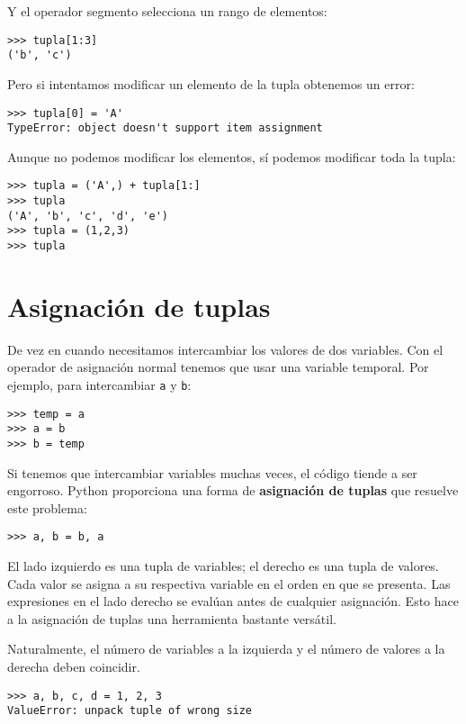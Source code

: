 Y el operador segmento selecciona un rango de elementos:
\begin{lstlisting}
>>> tupla[1:3]
('b', 'c')
\end{lstlisting}

Pero si intentamos modificar un elemento de la tupla obtenemos un
error:

\begin{lstlisting}
>>> tupla[0] = 'A'
TypeError: object doesn't support item assignment
\end{lstlisting}

Aunque no podemos modificar los elementos, sí podemos modificar toda
la tupla:
\begin{lstlisting}
>>> tupla = ('A',) + tupla[1:]
>>> tupla
('A', 'b', 'c', 'd', 'e')
>>> tupla = (1,2,3)
>>> tupla
\end{lstlisting}

\section{Asignación de tuplas}

\label{tuple assignment}  

De vez en cuando necesitamos intercambiar los valores de dos variables.
Con el operador de asignación normal tenemos que usar una variable
temporal. Por ejemplo, para intercambiar \texttt{a} y \texttt{b}:
\begin{lstlisting}
>>> temp = a
>>> a = b
>>> b = temp
\end{lstlisting}

Si tenemos que intercambiar variables muchas veces, el código tiende
a ser engorroso. Python proporciona una forma de \textbf{asignación
de tuplas} que resuelve este problema:
\begin{lstlisting}
>>> a, b = b, a
\end{lstlisting}

El lado izquierdo es una tupla de variables; el derecho es una tupla
de valores. Cada valor se asigna a su respectiva variable en el orden
en que se presenta. Las expresiones en el lado derecho se evalúan
antes de cualquier asignación. Esto hace a la asignación de tuplas
una herramienta bastante versátil.

Naturalmente, el número de variables a la izquierda y el número de
valores a la derecha deben coincidir.
\begin{lstlisting}
>>> a, b, c, d = 1, 2, 3
ValueError: unpack tuple of wrong size
\end{lstlisting}

